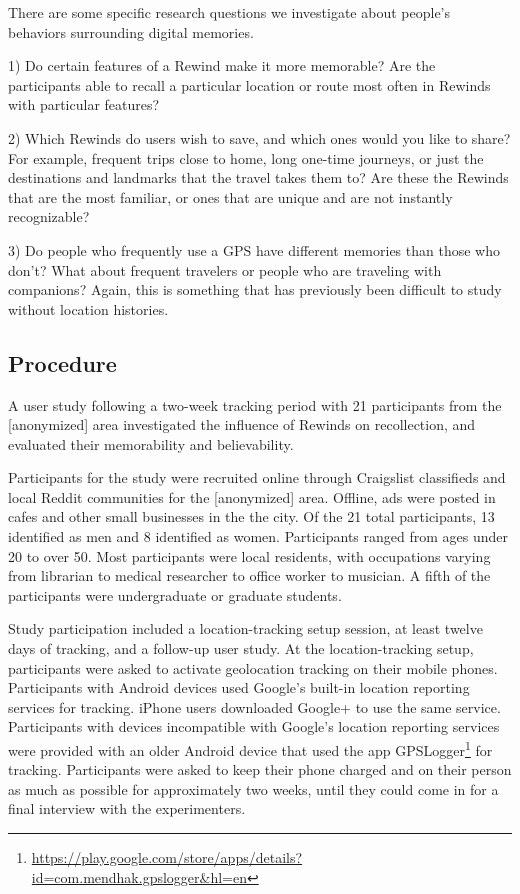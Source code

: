 \documentclass{sigchi}
\begin{document}
There are some specific research questions we investigate about people's behaviors surrounding digital memories.

1) Do certain features of a Rewind make it more memorable? Are the participants able to recall a particular location or route most often in Rewinds with particular features?

2) Which Rewinds do users wish to save, and which ones would you like to share? For example, frequent trips close to home, long one-time journeys, or just the destinations and landmarks that the travel takes them to? Are these the Rewinds that are the most familiar, or ones that are unique and are not instantly recognizable?

3) Do people who frequently use a GPS have different memories than those who don't? What about frequent travelers or people who are traveling with companions? Again, this is something that has previously been difficult to study without location histories.

\subsection{Procedure}
A user study following a two-week tracking period with 21 participants from the [anonymized] area investigated the influence of Rewinds on recollection, and evaluated their memorability and believability.

Participants for the study were recruited online through Craigslist classifieds and local Reddit communities for the [anonymized] area. Offline, ads were posted in cafes and other small businesses in the the city. Of the 21 total participants, 13 identified as men and 8 identified as women. Participants ranged from ages under 20 to over 50. Most participants were local residents, with occupations varying from librarian to medical researcher to office worker to musician. A fifth of the participants were undergraduate or graduate students.

Study participation included a location-tracking setup session, at least twelve days of tracking, and a follow-up user study. At the location-tracking setup, participants were asked to activate geolocation tracking on their mobile phones. Participants with Android devices used Google's built-in location reporting services for tracking. iPhone users downloaded Google+ to use the same service. Participants with devices incompatible with Google's location reporting services were provided with an older Android device that used the app GPSLogger\footnote{\url{https://play.google.com/store/apps/details?id=com.mendhak.gpslogger&hl=en}} for tracking. Participants were asked to keep their phone charged and on their person as much as possible for approximately two weeks, until they could come in for a final interview with the experimenters.
\end{document}
